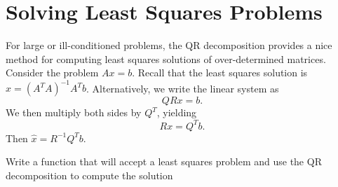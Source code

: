 \section*{Solving Least Squares Problems}
For large or ill-conditioned problems, the QR decomposition provides
a nice method for computing least squares solutions of
over-determined matrices.  Consider the problem $A x = b$.  Recall
that the least squares solution is $\widehat x = (A^T A)^{-1}A^T b$.
Alternatively, we write the linear system as
\[
Q R x = b.
\]
We then multiply both sides by $Q^T$, yielding
\[
R x = Q^T b.
\]
Then $\widehat x = R^{-1} Q^T b$.

\begin{problem}
Write a function that will accept a least squares problem and use the QR decomposition to compute the solution
\end{problem}
